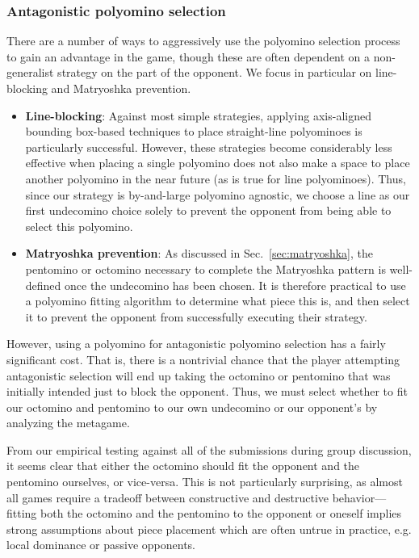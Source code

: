 \documentclass{scrartcl}
\begin{document}
\subsubsection{Antagonistic polyomino selection}\label{sec:antagonisticselect}
There are a number of ways to aggressively use the polyomino selection process to gain an advantage in the game, though these are often dependent on a non-generalist strategy on the part of the opponent. We focus in particular on line-blocking and Matryoshka prevention.

\begin{itemize}
\item \textbf{Line-blocking}: Against most simple strategies, applying axis-aligned bounding box-based techniques to place straight-line polyominoes is particularly successful. However, these strategies become considerably less effective when placing a single polyomino does not also make a space to place another polyomino in the near future (as is true for line polyominoes). Thus, since our strategy is by-and-large polyomino agnostic, we choose a line as our first undecomino choice solely to prevent the opponent from being able to select this polyomino.

\item \textbf{Matryoshka prevention}: As discussed in Sec.~\ref{sec:matryoshka}, the pentomino or octomino necessary to complete the Matryoshka pattern is well-defined once the undecomino has been chosen. It is therefore practical to use a polyomino fitting algorithm to determine what piece this is, and then select it to prevent the opponent from successfully executing their strategy.

\end{itemize}

However, using a polyomino for antagonistic polyomino selection has a fairly significant cost. That is, there is a nontrivial chance that the player attempting antagonistic selection will end up taking the octomino or pentomino that was initially intended just to block the opponent. Thus, we must select whether to fit our octomino and pentomino to our own undecomino or our opponent's by analyzing the metagame.

From our empirical testing against all of the submissions during group discussion, it seems clear that either the octomino should fit the opponent and the pentomino ourselves, or vice-versa. This is not particularly surprising, as almost all games require a tradeoff between constructive and destructive behavior---fitting both the octomino and the pentomino to the opponent or oneself implies strong assumptions about piece placement which are often untrue in practice, e.g. local dominance or passive opponents.
\end{document}
